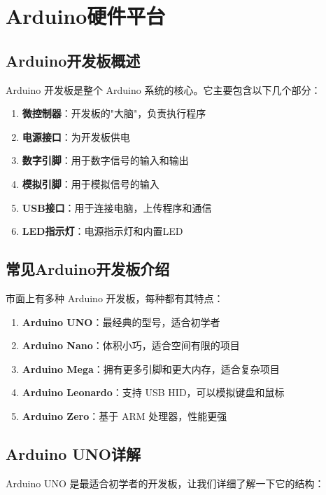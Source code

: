 \documentclass[12pt,UTF8]{ctexbook}
\begin{document}
\chapter{Arduino硬件平台}

\section{Arduino开发板概述}

Arduino 开发板是整个 Arduino 系统的核心。它主要包含以下几个部分：

\begin{enumerate}
    \item \textbf{微控制器}：开发板的"大脑"，负责执行程序
    \item \textbf{电源接口}：为开发板供电
    \item \textbf{数字引脚}：用于数字信号的输入和输出
    \item \textbf{模拟引脚}：用于模拟信号的输入
    \item \textbf{USB接口}：用于连接电脑，上传程序和通信
    \item \textbf{LED指示灯}：电源指示灯和内置LED
\end{enumerate}

\section{常见Arduino开发板介绍}

市面上有多种 Arduino 开发板，每种都有其特点：

\begin{enumerate}
    \item \textbf{Arduino UNO}：最经典的型号，适合初学者
    \item \textbf{Arduino Nano}：体积小巧，适合空间有限的项目
    \item \textbf{Arduino Mega}：拥有更多引脚和更大内存，适合复杂项目
    \item \textbf{Arduino Leonardo}：支持 USB HID，可以模拟键盘和鼠标
    \item \textbf{Arduino Zero}：基于 ARM 处理器，性能更强
\end{enumerate}

\section{Arduino UNO详解}

Arduino UNO 是最适合初学者的开发板，让我们详细了解一下它的结构：
\end{document}
